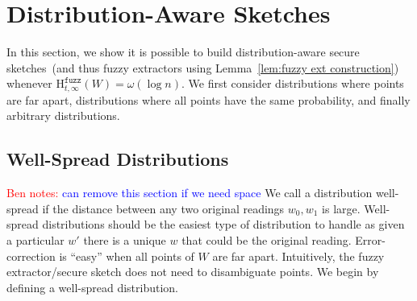 \documentclass[11pt]{article}
\newcommand{\secref}[1]{\mbox{Section~\ref{#1}}}
\newcommand{\lemref}[1]{\mbox{Lemma~\ref{#1}}}
\newcommand{\Hfuzz}{\mathrm{H}^{\mathtt{fuzz}}_{t,\infty}}
\newcommand{\authnote}[2]{{\textcolor{red}{\textsf{#1 notes: }\textcolor{blue}{ #2}}\marginpar{\textcolor{red}{\textbf{!!!!!}}}}}
\newcommand{\authnote}[2]{}
\newcommand{\bnote}[1]{{\authnote{Ben}{#1}}}
\begin{document}
\section{Distribution-Aware  Sketches}
\label{sec:distribution aware}
In this section, we show it is possible to build distribution-aware secure sketches~(and thus fuzzy extractors using \lemref{lem:fuzzy ext construction}) whenever $\Hfuzz(W)= \omega(\log n)$.
We first consider distributions where points are far apart, distributions where all points have the same probability, and finally arbitrary distributions.




\subsection{Well-Spread Distributions}
\bnote{can remove this section if we need space}
We call a distribution well-spread if the distance between any two original readings $w_0, w_1$ is large.  Well-spread distributions should be the easiest type of distribution to handle as given a particular $w'$ there is a unique $w$ that could be the original reading.  Error-correction is ``easy'' when all points of $W$ are far apart.  Intuitively, the fuzzy extractor/secure sketch does not need to disambiguate points.  %
We begin by defining a well-spread distribution.
\end{document}
